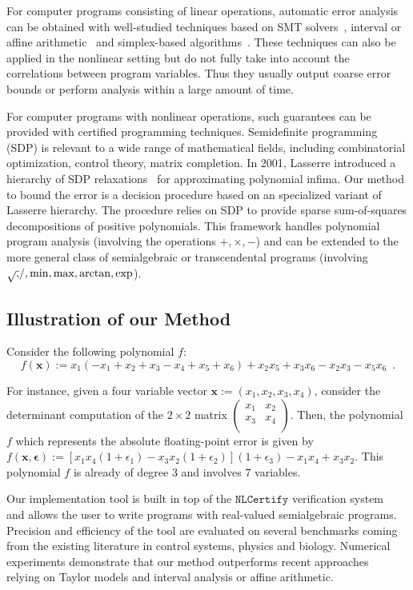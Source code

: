 \documentclass[a4paper,10pt]{article}
\newcommand{\x}{\mathbf{x}}
\newcommand{\epsilonb}{\boldsymbol{\epsilon}}
\newcommand{\nlcertify}{\mathtt{NLCertify}}
\theoremstyle{plain}
\theoremstyle{definition}
\theoremstyle{remark}
\begin{document}
For computer programs consisting of linear operations, automatic error analysis can be obtained with well-studied techniques based on SMT solvers~\cite{hgbk2012fmcad}, interval or affine arithmetic~\cite{fluctuat} and simplex-based algorithms~\cite{}. 
These techniques can also be applied in the nonlinear setting but do not fully take into account the correlations between program variables. Thus they usually output coarse error bounds or perform analysis within a large amount of time.

For computer programs with nonlinear operations, such guarantees can be provided with certified programming techniques.
Semidefinite programming (SDP) is relevant to a wide range of mathematical fields, including combinatorial optimization, control theory, matrix completion. In 2001, Lasserre introduced a hierarchy of SDP relaxations~\cite{Lasserre01moments} for approximating polynomial infima. Our method to bound the error is a decision procedure based on an specialized variant of Lasserre hierarchy. The procedure relies on SDP to provide sparse sum-of-squares decompositions of positive polynomials. This framework handles polynomial program analysis (involving the operations $+,\times,-$) and can be extended to the more general class of semialgebraic or transcendental programs (involving $\sqrtsign, /, \min, \max, \arctan, \exp$).




\subsection{Illustration of our Method}
Consider the following polynomial $f$:
\[ f(\x) := x_1 ( - x_1 +  x_2 +  x_3  - x_4 +  x_5 +  x_6) 
+ x_2 x_5 + x_3 x_6 - x_2 x_3  - x_5 x_6\enspace. \]

For instance, given a four variable vector $\x := (x_1, x_2, x_3, x_4)$, consider the  determinant computation of the $2 \times 2$ matrix  $\begin{pmatrix}
x_1 & x_2 \\
x_3 & x_4 \\
\end{pmatrix}$.
%
Then, the polynomial $f$ which represents the absolute floating-point error is given by $f(\x, \epsilonb) := [x_1 x_4 (1 + \epsilon_1) - x_3 x_2 (1 + \epsilon_2)] (1 + \epsilon_3) - x_1 x_4 + x_3 x_2$.
This polynomial $f$ is already of degree 3 and involves 7 variables.

Our implementation tool is built in top of the $\nlcertify$ verification system~\cite{icms14} and allows the user to write programs with real-valued semialgebraic programs. %
Precision and efficiency of the tool are evaluated on several benchmarks coming from the existing literature in control systems, physics and biology. Numerical experiments demonstrate that our method outperforms recent approaches~\cite{Darulova14Popl,fptaylor15} relying on Taylor models and interval analysis or affine arithmetic.
\end{document}
